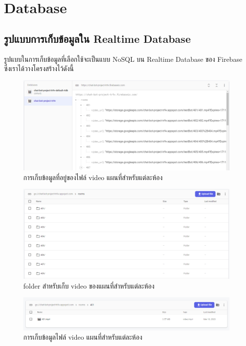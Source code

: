 \section{Database}
\subsection{รูปแบบการเก็บข้อมูลใน Realtime Database}
รูปแบบในการเก็บข้อมูลที่เลือกใช้จะเป็นแบบ NoSQL บน Realtime Database ของ Firebase ซึ่งเราได้วางโครงสร้างไว้ดังนี้
\begin{figure}[hbt!]
  \begin{center}
    \includegraphics[width=\textwidth,keepaspectratio]{pic/database_mapPath.png}
  \end{center}
  \caption{การเก็บข้อมูลที่อยู่ของไฟล์ video แผนที่สำหรับแต่ละห้อง}
  \label{fig:db_mapPath}
\end{figure}

\begin{figure}[hbt!]
  \begin{center}
    \includegraphics[width=\textwidth,keepaspectratio]{pic/db_storage_folder.png}
  \end{center}
  \caption{folder สำหรับเก็บ video ของแผนที่สำหรับแต่ละห้อง}
  \label{fig:db_storage_floorFolder}
\end{figure}

\begin{figure}[hbt!]
  \begin{center}
    \includegraphics[width=\textwidth,keepaspectratio]{pic/db_storage_file.png}
  \end{center}
  \caption{การเก็บข้อมูลไฟล์ video แผนที่สำหรับแต่ละห้อง}
  \label{fig:db_storage}
\end{figure}

